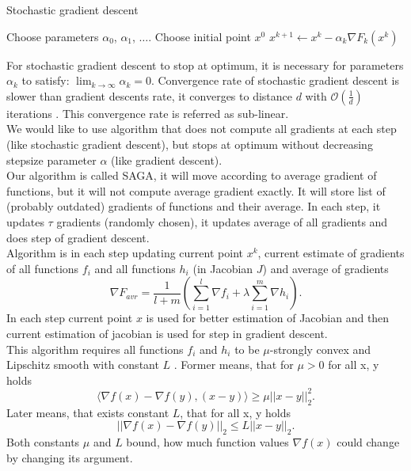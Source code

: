 \documentclass[11pt]{book}
\begin{document}
\begin{algorithm}[H]
	\caption{Stochastic gradient descent \cite{SGD}}
	\label{alg:sgd}
	\begin{algorithmic}[1]
		\State Choose parameters $\alpha_0$, $\alpha_1$, $\dots$.
		\State Choose initial point $x^0$
		\State $x^{k+1} \leftarrow x^k - \alpha_k\nabla F_k(x^k) $
		\EndFor
	\end{algorithmic}
\end{algorithm}

For stochastic gradient descent to stop at optimum, it is necessary for parameters $\alpha_k$ to satisfy: $\lim_{k \rightarrow \infty}\alpha_k=0 $. Convergence rate of stochastic gradient descent is slower than gradient descents rate, it converges to distance $d$ with $\mathcal{O}(\frac{1}{d})$ iterations \cite{SGD}. This convergence rate is referred as sub-linear.\\

We would like to use algorithm that does not compute all gradients at each step (like stochastic gradient descent), but stops at optimum without decreasing stepsize parameter $\alpha$ (like gradient descent).\\

Our algorithm is called SAGA, it will move according to average gradient of functions, but it will not compute average gradient exactly. It will store list of (probably outdated) gradients of functions and their average. In each step, it updates $\tau$ gradients (randomly chosen), it updates average of all gradients and does step of gradient descent\cite{SAGA}.\\

Algorithm is in each step updating current point $x^k$, current estimate of gradients of all functions $f_i$ and all functions $h_i$ (in Jacobian $J$) and average of gradients $$\nabla F_{avr}= \frac{1}{l+m}\left( \sum_{i=1}^l \nabla f_i + \lambda\sum_{i=1}^m \nabla h_i \right).$$ In each step current point $x$ is used for better estimation of Jacobian and then current estimation of jacobian is used for step in gradient descent.\\

This algorithm requires all functions $f_i$ and $h_i$ to be $\mu$-strongly convex and Lipschitz smooth with constant $L$ \cite{SAGA}. Former means, that for $\mu>0$ for all x, y holds $$\langle \nabla f(x) - \nabla f(y), (x-y) \rangle \geq \mu ||x-y||_2^2. $$
Later means, that exists constant $L$, that for all x, y holds $$||\nabla f(x) - \nabla f(y)||_2 \leq L ||x-y||_2.$$ Both constants $\mu$ and $L$ bound, how much function values $\nabla f(x)$ could change by changing its argument.
\end{document}
